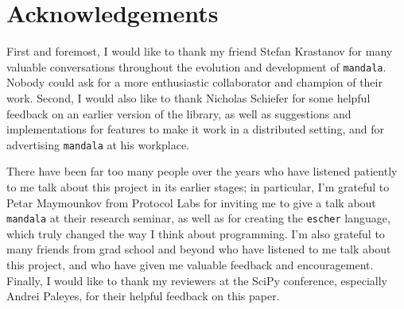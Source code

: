 \documentclass{article} %
\begin{document}
\section*{Acknowledgements}

First and foremost, I would like to thank my friend Stefan Krastanov for many
valuable conversations throughout the evolution and development of 
\texttt{mandala}. Nobody could ask for a more enthusiastic collaborator and
champion of their work. Second, I would also like to thank Nicholas Schiefer for
some helpful feedback on an earlier version of the library, as well as
suggestions and implementations for features to make it work in a distributed
setting, and for advertising \texttt{mandala} at his workplace. 

There have been far too many people over the years who have listened patiently
to me talk about this project in its earlier stages; in particular, I'm grateful
to Petar Maymounkov from Protocol Labs for inviting me to give a talk about
\texttt{mandala} at their research seminar, as well as for creating the
\texttt{escher} language, which truly changed the way I think about programming.
I'm also grateful to many friends from grad school and beyond who have listened
to me talk about this project, and who have given me valuable feedback and
encouragement. Finally, I would like to thank my reviewers at the SciPy
conference, especially Andrei Paleyes, for their helpful feedback on this paper.



\end{document}
